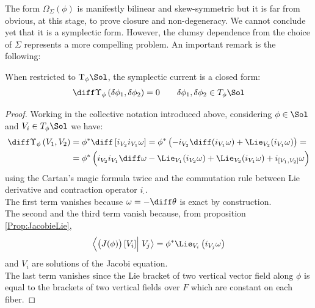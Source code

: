 \documentclass[a4paper,12pt,fleqn]{scrartcl}  %
\begin{document}
The form $\Omega_\Sigma (\phi)$ is manifestly bilinear and skew-symmetric but it is far from obvious, at this stage, to prove closure and non-degeneracy. We cannot conclude yet that it is a symplectic form.
However, the clumsy dependence from the choice of $\Sigma$ represents a more compelling problem.
An important remark is the following:

\begin{proposition}\label{Prop:CurrentClosed}
	When restricted to $\textrm{T}_\phi \Sol$, the symplectic current is a closed form:
	\begin{displaymath}
		\diff \Upsilon_\phi \left( \delta \phi_1 , \delta \phi_2 \right) = 0 \qquad \delta \phi_1 , \delta \phi_2 \in T_\phi \Sol
	\end{displaymath}
\end{proposition}
\begin{proof}
	Working in the collective notation introduced above, considering $\phi \in \Sol$ and $V_i \in T_\phi \Sol$  we have:
	\begin{align*}
		\diff \Upsilon_\phi \left( V_1 , V_2 \right) &= 
		\phi^\ast \diff \left[ i_{V_2} i_{V_1} \omega \right] = 
		\phi^\ast \left( - i_{V_2} \diff ( i_{V_1} \omega )  + \Lie_{V_2 } ( i_{V_1} \omega ) \right) =	\\
		&= \phi^\ast \left( 
			i_{V_2}i_{V_1} \diff \omega - 
			\Lie_{V_1 } ( i_{V_2} \omega ) +
			\Lie_{V_2 } ( i_{V_1} \omega ) +
			i_{[V_1,V_2]} \omega
		\right)
	\end{align*}
	using the Cartan's magic formula twice and the commutation rule between Lie derivative and contraction operator $i_\cdot$.\\
	The first term vanishes because $\omega= - \diff \theta$ is exact by construction.\\
	The second and the third term vanish because, from proposition \ref{Prop:JacobieLie},
	\begin{displaymath}
		\left\langle \left( J(\phi) \right)[V_i] \right\vert \left. V_j \right\rangle = 
		\phi^\ast \Lie_{V_i} \left( i_{V_j} \omega \right)
	\end{displaymath}
	and $V_i$ are solutions of the Jacobi equation.\\
	The last term vanishes since the Lie bracket of two vertical vector field along $\phi$ is equal to the brackets of two vertical fields over $F$ which are constant on each fiber.
\end{proof}
\end{document}
